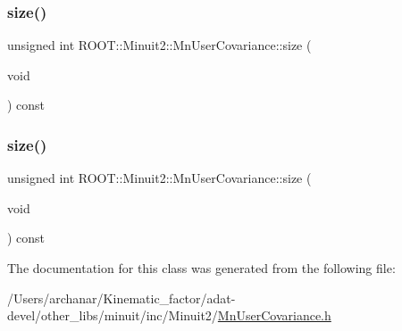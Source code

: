 \mbox{\label{classROOT_1_1Minuit2_1_1MnUserCovariance_ab15b9a83170c4e1bda1c22634fe020f5}} 
\subsubsection{\texorpdfstring{size()}{size()}\hspace{0.1cm}{\footnotesize\ttfamily [2/3]}}
{\footnotesize\ttfamily unsigned int R\+O\+O\+T\+::\+Minuit2\+::\+Mn\+User\+Covariance\+::size (\begin{DoxyParamCaption}\item[{void}]{ }\end{DoxyParamCaption}) const\hspace{0.3cm}{\ttfamily [inline]}}

\mbox{\label{classROOT_1_1Minuit2_1_1MnUserCovariance_ab15b9a83170c4e1bda1c22634fe020f5}} 
\subsubsection{\texorpdfstring{size()}{size()}\hspace{0.1cm}{\footnotesize\ttfamily [3/3]}}
{\footnotesize\ttfamily unsigned int R\+O\+O\+T\+::\+Minuit2\+::\+Mn\+User\+Covariance\+::size (\begin{DoxyParamCaption}\item[{void}]{ }\end{DoxyParamCaption}) const\hspace{0.3cm}{\ttfamily [inline]}}



The documentation for this class was generated from the following file\+:\begin{DoxyCompactItemize}
\item 
/\+Users/archanar/\+Kinematic\+\_\+factor/adat-\/devel/other\+\_\+libs/minuit/inc/\+Minuit2/\mbox{\hyperlink{adat-devel_2other__libs_2minuit_2inc_2Minuit2_2MnUserCovariance_8h}{Mn\+User\+Covariance.\+h}}\end{DoxyCompactItemize}
